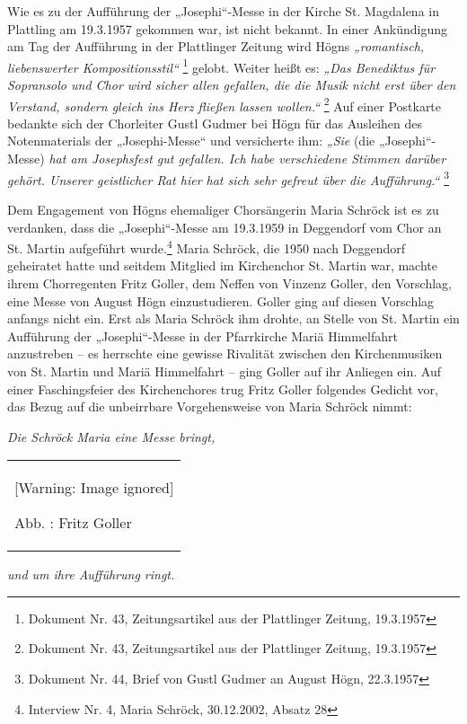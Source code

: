 \documentclass[a4paper]{article}
\newcommand\textstyleZitate[1]{\textit{#1}}
\newcounter{Abb}
\renewcommand\theAbb{\arabic{Abb}}
\begin{document}
Wie es zu der Aufführung der „Josephi“-Messe in der Kirche St. Magdalena
in Plattling am 19.3.1957 gekommen war, ist nicht bekannt. In einer
Ankündigung am Tag der Aufführung in der Plattlinger Zeitung wird Högns
\textstyleZitate{„romantisch, liebenswerter Kompositionsstil“
}\footnote{ Dokument Nr. 43, Zeitungsartikel aus der Plattlinger
Zeitung, 19.3.1957} gelobt. Weiter heißt es: \textstyleZitate{„Das
Benediktus für Sopransolo und Chor wird sicher allen gefallen, die die
Musik nicht erst über den Verstand, sondern gleich ins Herz fließen
lassen wollen.“ }\footnote{ Dokument Nr. 43, Zeitungsartikel aus der
Plattlinger Zeitung, 19.3.1957} Auf einer Postkarte bedankte sich der
Chorleiter Gustl Gudmer bei Högn für das Ausleihen des Notenmaterials
der „Josephi-Messe“ und versicherte ihm: \textstyleZitate{„Sie }(die
„Josephi“-Messe)\textstyleZitate{ hat am Josephsfest gut gefallen. Ich
habe verschiedene Stimmen darüber gehört. Unserer geistlicher Rat hier
hat sich sehr gefreut über die Aufführung.“ }\footnote{ Dokument Nr.
44, Brief von Gustl Gudmer an August Högn, 22.3.1957}

Dem Engagement von Högns ehemaliger Chorsängerin Maria Schröck ist es zu
verdanken, dass die „Josephi“-Messe am 19.3.1959 in Deggendorf vom Chor
an St. Martin aufgeführt wurde.\footnote{ Interview Nr. 4, Maria
Schröck, 30.12.2002, Absatz 28} Maria Schröck, die 1950 nach Deggendorf
geheiratet hatte und seitdem Mitglied im Kirchenchor St. Martin war,
machte ihrem Chorregenten Fritz Goller, dem Neffen von Vinzenz Goller,
den Vorschlag, eine Messe von August Högn einzustudieren. Goller ging
auf diesen Vorschlag anfangs nicht ein. Erst als Maria Schröck ihm
drohte, an Stelle von St. Martin ein Aufführung der „Josephi“-Messe in
der Pfarrkirche Mariä Himmelfahrt anzustreben – es herrschte eine
gewisse Rivalität zwischen den Kirchenmusiken von St. Martin und Mariä
Himmelfahrt – ging Goller auf ihr Anliegen ein. Auf einer
Faschingsfeier des Kirchenchores trug Fritz Goller folgendes Gedicht
vor, das Bezug auf die unbeirrbare Vorgehensweise von Maria Schröck
nimmt:

\textstyleZitate{Die Schröck Maria eine Messe bringt, }

\begin{center}
\begin{minipage}{4.598cm}
\begin{flushleft}
\tablefirsthead{}
\tablehead{}
\tabletail{}
\tablelasttail{}
\begin{supertabular}{m{4.3980002cm}}
  [Warning: Image ignored] %
 
Abb. \stepcounter{Abb}{\theAbb}: Fritz Goller \\
\end{supertabular}
\end{flushleft}
\end{minipage}
\end{center}
\textstyleZitate{und um ihre Aufführung ringt.}
\end{document}

